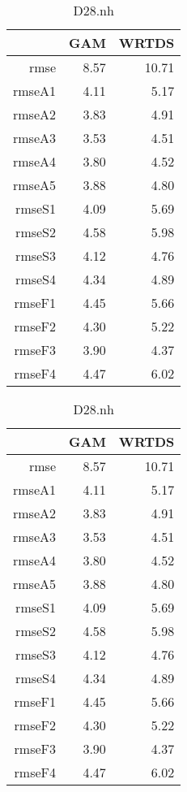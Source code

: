 \documentclass[12pt]{amsart}
\begin{document}
\begin{table}[H]
\centering
\begin{tabular}{rrr}
  \hline
 & GAM & WRTDS \\ 
  \hline
rmse & 8.57 & 10.71 \\ 
  rmseA1 & 4.11 & 5.17 \\ 
  rmseA2 & 3.83 & 4.91 \\ 
  rmseA3 & 3.53 & 4.51 \\ 
  rmseA4 & 3.80 & 4.52 \\ 
  rmseA5 & 3.88 & 4.80 \\ 
  rmseS1 & 4.09 & 5.69 \\ 
  rmseS2 & 4.58 & 5.98 \\ 
  rmseS3 & 4.12 & 4.76 \\ 
  rmseS4 & 4.34 & 4.89 \\ 
  rmseF1 & 4.45 & 5.66 \\ 
  rmseF2 & 4.30 & 5.22 \\ 
  rmseF3 & 3.90 & 4.37 \\ 
  rmseF4 & 4.47 & 6.02 \\ 
   \hline
\end{tabular}
\caption{D28.nh}
\end{table}

\begin{table}[H]
\centering
\begin{tabular}{rrr}
  \hline
 & GAM & WRTDS \\ 
  \hline
rmse & 8.57 & 10.71 \\ 
  rmseA1 & 4.11 & 5.17 \\ 
  rmseA2 & 3.83 & 4.91 \\ 
  rmseA3 & 3.53 & 4.51 \\ 
  rmseA4 & 3.80 & 4.52 \\ 
  rmseA5 & 3.88 & 4.80 \\ 
  rmseS1 & 4.09 & 5.69 \\ 
  rmseS2 & 4.58 & 5.98 \\ 
  rmseS3 & 4.12 & 4.76 \\ 
  rmseS4 & 4.34 & 4.89 \\ 
  rmseF1 & 4.45 & 5.66 \\ 
  rmseF2 & 4.30 & 5.22 \\ 
  rmseF3 & 3.90 & 4.37 \\ 
  rmseF4 & 4.47 & 6.02 \\ 
   \hline
\end{tabular}
\caption{D28.nh}
\end{table}
\end{document}
